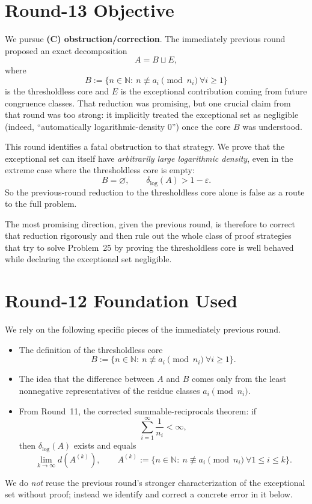 \section{Round-13 Objective}
We pursue \textbf{(C) obstruction/correction}.  The immediately previous round proposed an exact decomposition
\[
A=B\sqcup E,
\]
where
\[
B:=\{n\in\mathbb N:\ n\not\equiv a_i\pmod{n_i}\ \forall i\ge 1\}
\]
is the thresholdless core and \(E\) is the exceptional contribution coming from future congruence classes.  That reduction was promising, but one crucial claim from that round was too strong: it implicitly treated the exceptional set as negligible (indeed, ``automatically logarithmic-density \(0\)'') once the core \(B\) was understood.

This round identifies a fatal obstruction to that strategy.
We prove that the exceptional set can itself have \emph{arbitrarily large logarithmic density}, even in the extreme case where the thresholdless core is empty:
\[
B=\varnothing,
\qquad
\delta_{\log}(A)>1-\varepsilon.
\]
So the previous-round reduction to the thresholdless core alone is false as a route to the full problem.

The most promising direction, given the previous round, is therefore to correct that reduction rigorously and then rule out the whole class of proof strategies that try to solve Problem~25 by proving the thresholdless core is well behaved while declaring the exceptional set negligible.

\section{Round-12 Foundation Used}
We rely on the following specific pieces of the immediately previous round.
\begin{itemize}
\item The definition of the thresholdless core
\[
B:=\{n\in\mathbb N:\ n\not\equiv a_i\pmod{n_i}\ \forall i\ge 1\}.
\]
\item The idea that the difference between \(A\) and \(B\) comes only from the least nonnegative representatives of the residue classes \(a_i\pmod{n_i}\).
\item From Round~11, the corrected summable-reciprocals theorem: if
\[
\sum_{i=1}^{\infty}\frac1{n_i}<\infty,
\]
then \(\delta_{\log}(A)\) exists and equals
\[
\lim_{k\to\infty} d(A^{(k)}),
\qquad
A^{(k)}:=\{n\in\mathbb N:\ n\not\equiv a_i\pmod{n_i}\ \forall 1\le i\le k\}.
\]
\end{itemize}
We do \emph{not} reuse the previous round's stronger characterization of the exceptional set without proof; instead we identify and correct a concrete error in it below.

